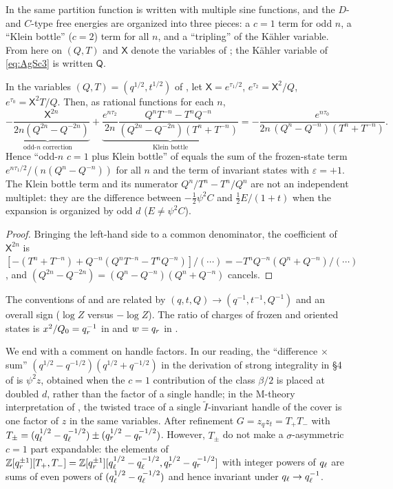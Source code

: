 In \cite{AM22} the same partition function is written with multiple sine functions, and the $D$- and $C$-type free energies are organized into three pieces: a $c = 1$ term for odd $n$, a ``Klein bottle'' ($c = 2$) term for all $n$, and a ``tripling'' of the K\"ahler variable. From here on $(Q, T)$ and $\mathsf X$ denote the variables of \cite{AM22}; the K\"ahler variable of \eqref{eq:AgSc3} is written $\mathsf{Q}$.
\begin{proposition}\label{prop:AM}
In the variables $(Q, T) = (q^{1/2}, t^{1/2})$ of \cite{AM22}, let $\mathsf X = e^{\tau_1/2}$, $e^{\tau_2} = \mathsf X^2/Q$, $e^{\tau_0} = \mathsf X^2 T/Q$. Then, as rational functions for each $n$,
\begin{equation}\label{eq:AM}
\underbrace{-\frac{\mathsf X^{2n}}{2n(Q^{2n} - Q^{-2n})}}_{\text{odd-$n$ correction}}
+ \underbrace{\frac{e^{n\tau_2}}{2n}\frac{Q^n T^{-n} - T^n Q^{-n}}{(Q^{2n} - Q^{-2n})(T^n + T^{-n})}}_{\text{Klein bottle}}
= -\frac{e^{n\tau_0}}{2n\,(Q^n - Q^{-n})(T^n + T^{-n})} .
\end{equation}
Hence ``odd-$n$ $c = 1$ plus Klein bottle'' of \cite{AM22} equals the sum of the frozen-state term $e^{n\tau_1/2}/(n(Q^n - Q^{-n}))$ for all $n$ and the term of invariant states with $\varepsilon = +1$. The Klein bottle term and its numerator $Q^n/T^n - T^n/Q^n$ are not an independent multiplet: they are the difference between $-\tfrac12\psi^2 C$ and $\tfrac12 E/(1+t)$ when the expansion is organized by odd $d$ ($E \ne \psi^2 C$).
\end{proposition}
\begin{proof}
Bringing the left-hand side to a common denominator, the coefficient of $\mathsf X^{2n}$ is $[-(T^n + T^{-n}) + Q^{-n}(Q^nT^{-n} - T^nQ^{-n})]/(\cdots) = -T^nQ^{-n}(Q^n + Q^{-n})/(\cdots)$, and $(Q^{2n} - Q^{-2n}) = (Q^n - Q^{-n})(Q^n + Q^{-n})$ cancels.
\end{proof}
The conventions of \cite{AM22} and \cite{AgSc12} are related by $(q, t, Q) \to (q^{-1}, t^{-1}, Q^{-1})$ and an overall sign ($\log Z$ versus $-\log Z$). The ratio of charges of frozen and oriented states is $x^2/Q_0 = q_r^{-1}$ in \cite{AgSc12} and $w = q_r$ in \cite{AM22}.

We end with a comment on handle factors. In our reading, the ``difference $\times$ sum'' $(q^{1/2} - q^{-1/2})(q^{1/2} + q^{-1/2})$ in the derivation of strong integrality in \S4 of \cite{AgSc12} is $\psi^2 z$, obtained when the $c = 1$ contribution of the class $\beta/2$ is placed at doubled $d$, rather than the factor of a single handle; in the M-theory interpretation of \cite{PU14}, the twisted trace of a single $\tilde I$-invariant handle of the cover is one factor of $z$ in the same variables. After refinement $G = z_q z_t = T_+T_-$ with $T_\pm = (q_\ell^{1/2} - q_\ell^{-1/2}) \pm (q_r^{1/2} - q_r^{-1/2})$. However, $T_\pm$ do not make a $\sigma$-asymmetric $c = 1$ part expandable: the elements of $\mathbb{Z}[q_r^{\pm 1}][T_+, T_-] = \mathbb{Z}[q_r^{\pm1}][q_\ell^{1/2} - q_\ell^{-1/2}, q_r^{1/2} - q_r^{-1/2}]$ with integer powers of $q_\ell$ are sums of even powers of $(q_\ell^{1/2} - q_\ell^{-1/2})$ and hence invariant under $q_\ell \to q_\ell^{-1}$.
